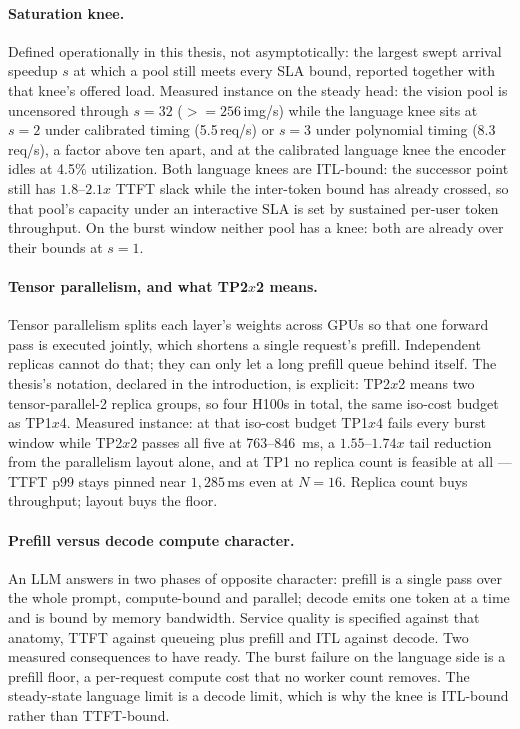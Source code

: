 \documentclass[11pt,a4paper]{article}
\def\times{x}\def\rho{rho}\def\approx{~}\def\leq{<=}\def\geq{>=}%
\def\emph#1{#1}\def\texttt#1{#1}%
\begin{document}
\paragraph{Saturation knee.} Defined operationally in this thesis, not
asymptotically: the largest swept arrival speedup $s$ at which a pool still
meets \emph{every} SLA bound, reported together with that knee's offered
load. Measured instance on the steady head: the vision pool is uncensored
through $s{=}32$ ($\geq 256$\,img/s) while the language knee sits at $s{=}2$
under calibrated timing (5.5\,req/s) or $s{=}3$ under polynomial timing
(8.3\,req/s), a factor above ten apart, and at the calibrated language knee
the encoder idles at 4.5\% utilization. Both language knees are
\emph{ITL-bound}: the successor point still has $1.8$--$2.1\times$ TTFT slack
while the inter-token bound has already crossed, so that pool's capacity
under an interactive SLA is set by sustained per-user token throughput. On
the burst window neither pool has a knee: both are already over their bounds
at $s{=}1$.

\paragraph{Tensor parallelism, and what TP2$\times$2 means.} Tensor
parallelism splits each layer's weights across GPUs so that one forward pass
is executed jointly, which shortens a \emph{single} request's prefill.
Independent replicas cannot do that; they can only let a long prefill queue
behind itself. The thesis's notation, declared in the introduction, is
explicit: TP2$\times$2 means \emph{two tensor-parallel-2 replica groups}, so
four H100s in total, the same iso-cost budget as TP1$\times$4. Measured
instance: at that iso-cost budget TP1$\times$4 fails every burst window while
TP2$\times$2 passes all five at 763--\SI{846}{\milli\second}, a
$1.55$--$1.74\times$ tail reduction from the parallelism \emph{layout} alone,
and at TP1 no replica count is feasible at all --- TTFT p99 stays pinned near
$1{,}285$\,ms even at $N{=}16$. Replica count buys throughput; layout buys
the floor.

\paragraph{Prefill versus decode compute character.} An LLM answers in two
phases of opposite character: prefill is a single pass over the whole prompt,
compute-bound and parallel; decode emits one token at a time and is bound by
memory bandwidth. Service quality is specified against that anatomy, TTFT
against queueing plus prefill and ITL against decode. Two measured
consequences to have ready. The burst failure on the language side is a
\emph{prefill} floor, a per-request compute cost that no worker count
removes. The steady-state language limit is a \emph{decode} limit, which is
why the knee is ITL-bound rather than TTFT-bound.
\end{document}
